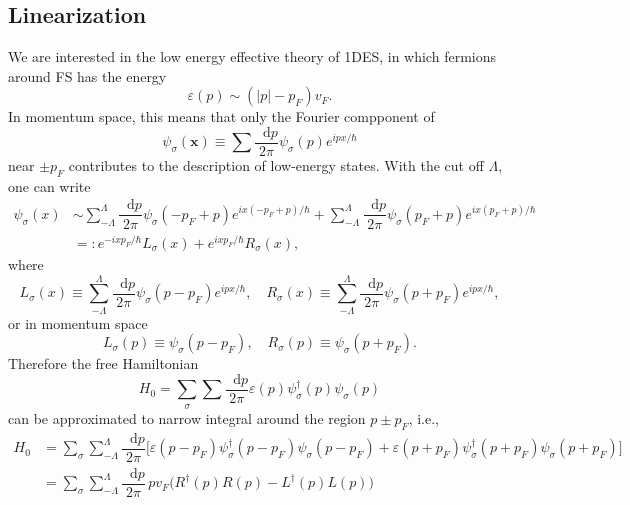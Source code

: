 \documentclass[10pt,nofootinbib]{revtex4}
\newcommand*\dd{\mathop{}\!\mathrm{d}}
\begin{document}
	\subsection{Linearization}
		We are interested in the low energy effective theory of 1DES, in which fermions around FS has the energy
		\begin{equation*}
			\varepsilon(p)\sim(|p|-p_F)v_F.
		\end{equation*}
		In momentum space, this means that only the Fourier compponent of 
		\begin{equation*}
			\psi_\sigma(\bm{x})\equiv\sum\dfrac{\dd p}{2\pi}\psi_\sigma(p)e^{ipx/\hbar}
		\end{equation*}
		near $\pm p_F$ contributes to the description of low-energy states. With the cut off $\Lambda$, one can write
		\begin{align}\label{1.2.1}
			\psi_\sigma(x)&\sim\sum_{-\Lambda}^\Lambda\dfrac{\dd p}{2\pi}\psi_\sigma(-p_F+p)e^{ix(-p_F+p)/\hbar}+\sum_{-\Lambda}^\Lambda\dfrac{\dd p}{2\pi}\psi_\sigma(p_F+p)e^{ix(p_F+p)/\hbar}\nonumber\\
			&=:e^{-ixp_F/\hbar}L_\sigma(x)+e^{ixp_F/\hbar}R_\sigma(x),
		\end{align}
		where
		\begin{equation*}
			L_\sigma(x)\equiv\sum_{-\Lambda}^\Lambda\dfrac{\dd p}{2\pi}\psi_\sigma(p-p_F)e^{ipx/\hbar},\quad R_\sigma(x)\equiv\sum_{-\Lambda}^\Lambda\dfrac{\dd p}{2\pi}\psi_\sigma(p+p_F)e^{ipx/\hbar},
		\end{equation*}
		or in momentum space
		\begin{equation*}
			L_\sigma(p)\equiv\psi_\sigma(p-p_F),\quad R_\sigma(p)\equiv\psi_\sigma(p+p_F).
		\end{equation*}
		Therefore the free Hamiltonian
		\begin{equation}\label{1.2.2}
			H_0=\sum_\sigma\sum\dfrac{\dd p}{2\pi} \varepsilon(p)\psi_\sigma^\dagger(p)\psi_\sigma(p)
		\end{equation}
		can be approximated to narrow integral around the region $p\pm p_F$, i.e.,
		\begin{align}
			H_0&=\sum_\sigma\sum_{-\Lambda}^\Lambda\dfrac{\dd p}{2\pi}\bigg[\varepsilon(p-p_F)\psi_\sigma^\dagger(p-p_F)\psi_\sigma(p-p_F)+\varepsilon(p+p_F)\psi_\sigma^\dagger(p+p_F)\psi_\sigma(p+p_F)\bigg]\nonumber\\
			&=\sum_\sigma\sum_{-\Lambda}^\Lambda\dfrac{\dd p}{2\pi}\,p v_F\bigg(R^\dagger(p)R(p)-L^\dagger(p)L(p)\bigg)
		\end{align}
\end{document}
